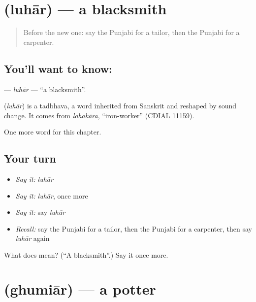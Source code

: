 \section[\texorpdfstring{\pa{ਲੁਹਾਰ} (luhār)}{ਲੁਹਾਰ (luhār)}]{ (luhār) — a blacksmith}

\label{lesson:PA-C139-luhar}



\begin{quote}
Before the new one: say the Punjabi for a tailor, then the Punjabi for a carpenter.
\end{quote}

\subsection*{You'll want to know: }
\textbf{} — \emph{luhār} — \textquotedblleft{}a blacksmith\textquotedblright{}.

\begin{cousinweb}
\textbf{} (\emph{luhār}) is a tadbhava, a word inherited from Sanskrit and reshaped by sound change. It comes from \emph{lohakāra}, \textquotedblleft{}iron-worker\textquotedblright{} (CDIAL 11159).
\end{cousinweb}

\begin{grammarlens}[title={What you've built}]
One more word for this chapter.
\end{grammarlens}

\subsection*{Your turn}
\begin{itemize}
\raggedright
  \item \emph{Say it:} \emph{luhār}
  \item \emph{Say it:} \emph{luhār}, once more
  \item \emph{Say it:} say \emph{luhār}
  \item \emph{Recall:} say the Punjabi for a tailor, then the Punjabi for a carpenter, then say \emph{luhār} again
\end{itemize}

\begin{tcolorbox}[breakable,colback=teal!4,colframe=teal!35!black,title={Before you move on}]
What does  mean? (\textquotedblleft{}A blacksmith\textquotedblright{}.) Say it once more.
\end{tcolorbox}
\section[\texorpdfstring{\pa{ਘੁਮਿਆਰ} (ghumiār)}{ਘੁਮਿਆਰ (ghumiār)}]{ (ghumiār) — a potter}

